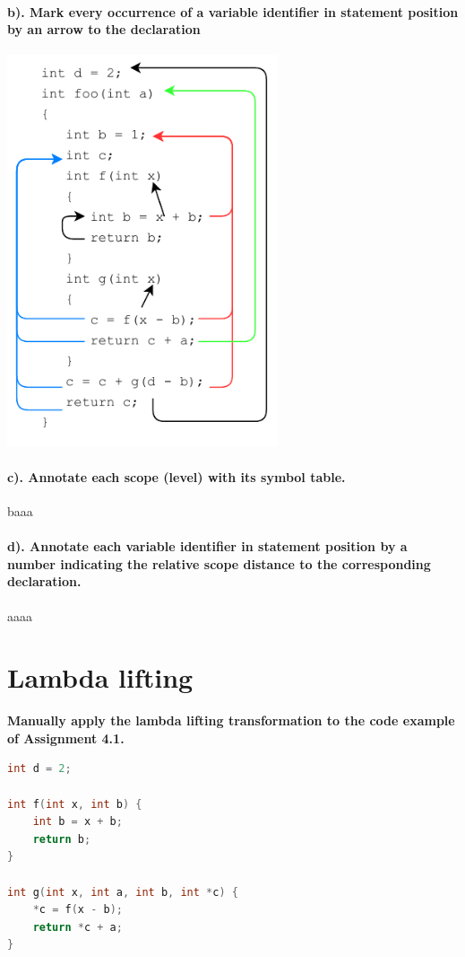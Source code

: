 \documentclass[hidelinks]{uva-inf-article}
\begin{document}
\begin{flushleft}
\paragraph{b). Mark every occurrence of a variable identifier in statement position by an arrow to the declaration\\}
\includegraphics[width=8cm]{images/1b.pdf}
\paragraph{c). Annotate each scope (level) with its symbol table.\\}
baaa
\paragraph{d). Annotate each variable identifier in statement position by a number indicating the relative scope distance to the corresponding declaration.\\}
aaaa
\newpage
\section{Lambda lifting}
\textbf{Manually apply the lambda lifting transformation to the code example of Assignment 4.1.} 
\begin{lstlisting}[basicstyle=\small, language=C]
int d = 2;

int f(int x, int b) {
	int b = x + b;
	return b;
}

int g(int x, int a, int b, int *c) {
	*c = f(x - b);
	return *c + a;
}


\end{lstlisting}
\end{flushleft}
\end{document}
